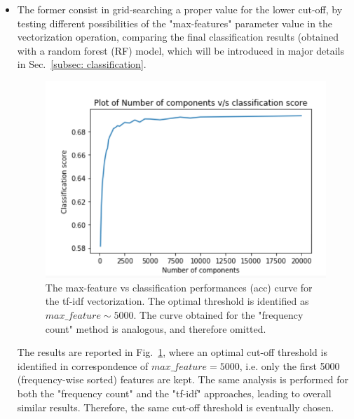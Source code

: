 \documentclass[10pt]{article}
\begin{document}
\begin{itemize}
\item The former consist in grid-searching a proper value for the lower cut-off, by testing different possibilities of the "max-features" parameter value in the vectorization operation, comparing the final classification results (obtained with a random forest (RF) model, which will be introduced in major details in Sec.~\ref{subsec: classification}.

\begin{figure}
\centering
\includegraphics[scale=0.3]{figs/max_feat.png}
\caption{\label{fig:max_feat}The max-feature vs classification performances (acc) curve for the tf-idf vectorization. The optimal threshold is identified as $max\_feature \sim 5000$. The curve obtained for the "frequency count" method is analogous, and therefore omitted. }
\end{figure}
The results are reported in Fig.~\ref{fig:max_feat}, where an optimal cut-off threshold is identified in correspondence of $max\_feature = 5000$, i.e. only the first 5000 (frequency-wise sorted) features are kept. 
The same analysis is performed for both the "frequency count" and the "tf-idf" approaches, leading to overall similar results. 
Therefore, the same cut-off threshold is eventually chosen.


\end{itemize}
\end{document}
